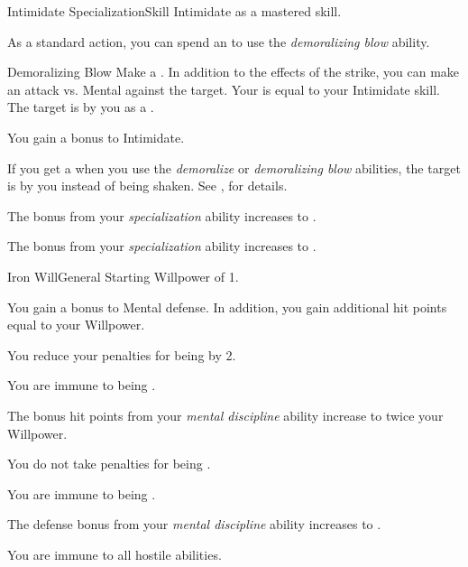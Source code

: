     \begin{feat}{Intimidate Specialization}{Skill}
        \featpre Intimidate as a mastered skill.

         As a standard action, you can spend an  to use the \textit{demoralizing blow} ability.
        \begin{ability}{Demoralizing Blow}
            Make a .
            In addition to the effects of the strike, you can make an attack vs. Mental against the target.
            Your  is equal to your Intimidate skill.
            \hit The target is \shaken by you as a .
        \end{ability}

         You gain a  bonus to Intimidate.

         If you get a  when you use the \textit{demoralize} or \textit{demoralizing blow} abilities, the target is \frightened by you instead of being shaken.
        See , for details.

         The bonus from your \textit{specialization} ability increases to .

         The bonus from your \textit{specialization} ability increases to .
    \end{feat}

    \begin{feat}{Iron Will}{General}
        \featpre Starting Willpower of 1.

         You gain a  bonus to Mental defense.
        In addition, you gain additional hit points equal to your Willpower.

         You reduce your penalties for being  by 2.

         You are immune to being .

         The bonus hit points from your \textit{mental discipline} ability increase to twice your Willpower.

         You do not take penalties for being .

         You are immune to being .

         The defense bonus from your \textit{mental discipline} ability increases to .

         You are immune to all hostile  abilities.
    \end{feat}

